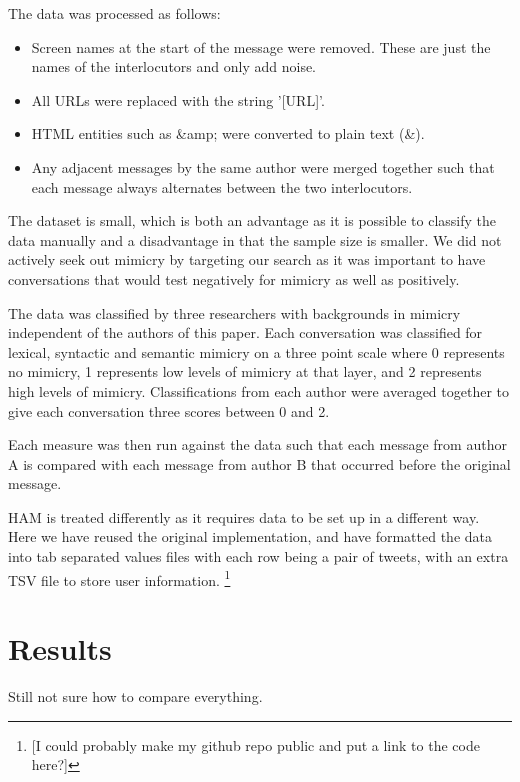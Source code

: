 \documentclass[conference]{IEEEtran}
\begin{document}
The data was processed as follows:
\begin{itemize}
	\item Screen names at the start of the message were removed. These are just the names of the 
		  interlocutors and only add noise.
	\item All URLs were replaced with the string '[URL]'.
	\item HTML entities such as \&amp; were converted to plain text (\&).
	\item Any adjacent messages by the same author were merged together such that each message always
	      alternates between the two interlocutors.
\end{itemize}

The dataset is small, which is both an advantage as it is possible to classify the data manually
and a disadvantage in that the sample size is smaller. We did not actively seek out mimicry by
targeting our search as it was important to have conversations that would test negatively for mimicry
as well as positively.

The data was classified by three researchers with backgrounds in mimicry independent of the authors of 
this paper.
Each  conversation was classified for lexical, syntactic and semantic mimicry on a three point scale 
where 0 represents no mimicry, 1 represents low levels of mimicry at that layer, and 2 represents high 
levels of mimicry. Classifications from each author were averaged together to give each conversation
three scores between 0 and 2.

Each measure was then run against the data such that each message from author A is compared with each 
message from author B that occurred before the original message.

HAM is treated differently as it requires data to be set up in a different way.
Here we have reused the original implementation, and have formatted the data into tab separated
values files with each row being a pair of tweets, with an extra TSV file to store user information.
\footnote{[I could probably make my github repo public and put a link to the code here?]}


\section{Results}
Still not sure how to compare everything.
\end{document}
